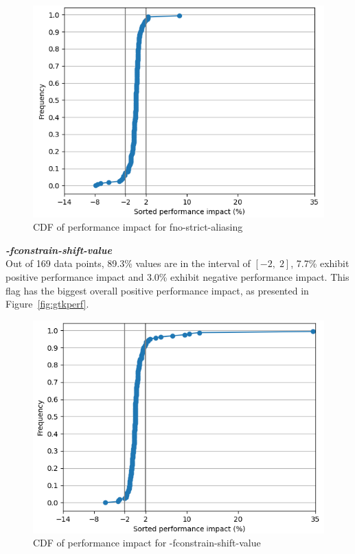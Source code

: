 \documentclass{sciposter}
\begin{document}
\begin{multicols}{3}
\begin{figure}[h!]
\centering
\includegraphics[scale=1.2]{fno-strict-aliasing}
\caption{CDF of performance impact for fno-strict-aliasing}
\end{figure}

\textbf{\textit{-fconstrain-shift-value}} \\
Out of 169 data points, 89.3\% values are in the interval of \( [-2,\;2] \), 
7.7\% exhibit positive performance impact and 3.0\% exhibit negative
performance impact. This flag has the biggest overall positive 
performance impact, as presented in Figure~\ref{fig:gtkperf}.

\begin{figure}[h!]
\centering
\includegraphics[scale=1.2]{fconstrain-shift-value}
\caption{CDF of performance impact for -fconstrain-shift-value}
\end{figure}


\end{multicols}
\end{document}
